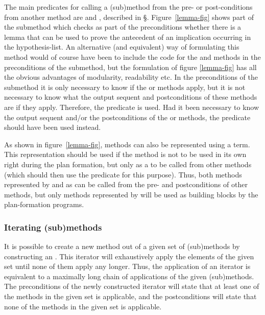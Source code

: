  The main predicates for calling a
(sub)method from the pre- or post-conditions from another method are
 and , described in
\S{}. Figure~\ref{lemma-fig} shows part of the
 submethod which checks as part of the preconditions
whether there is a lemma that can be used to prove the antecedent of
an implication occurring in the hypothesis-list. An alternative (and
equivalent) way of formulating this method would of course have been
to include the code for the  and
 methods in the preconditions of the 
submethod, but the formulation of figure \ref{lemma-fig} has all the
obvious advantages of modularity, readability etc. In the
preconditions of the  submethod
it is only necessary to know if the
 or
 methods apply,
but it is not necessary to know what the output sequent and
postconditions of these methods are if they apply. Therefore, the
predicate  is used. Had it been necessary to know the
output sequent and/or the postconditions of the  or
 methods, the predicate  should
have been used instead.

As shown in figure~\ref{lemma-fig}, methods can also be represented
using a  term. This  representation
should be used if the method is not to be used in its own right during
the plan formation, but only as a  to be called from
other methods (which should then use the 
predicate for this purpose). Thus, both methods represented by 
and as  can be called from
the pre- and postconditions of other methods, but only methods
represented by  will be used as building blocks by
the plan-formation programs. 

\subsubsection {Iterating (sub)methods}
\label{iterating-methods}

It is possible to create a new method out of a given set of
(sub)methods by constructing an {\em {}}. This iterator will
exhaustively apply the elements of the given set until none of them
apply any longer. Thus, the application of an iterator is equivalent
to a maximally long chain of applications of the given (sub)methods.
The preconditions of the newly constructed iterator will state that at
least one of the methods in the given set is applicable, and the
postconditions will state that none of the methods in the given set is
applicable. 

